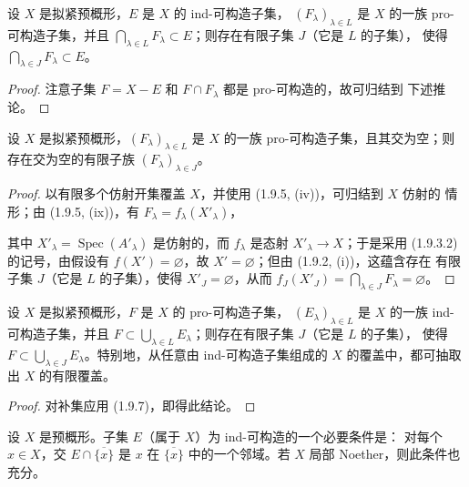 \begin{theorem}[1.9.7]
\label{IV.1.9.7-fr}
设 $X$ 是拟紧预概形，$E$ 是 $X$ 的 ind-可构造子集，
$(F_\lambda)_{\lambda\in L}$ 是 $X$ 的一族 pro-可构造子集，并且
$\bigcap_{\lambda\in L}F_\lambda\subset E$；则存在有限子集 $J$（它是 $L$ 的子集），
使得 $\bigcap_{\lambda\in J}F_\lambda\subset E$。
\end{theorem}

\begin{proof}
注意子集 $F=X-E$ 和 $F\cap F_\lambda$ 都是 pro-可构造的，故可归结到
下述推论。
\end{proof}

\begin{corollary}[1.9.8]
\label{IV.1.9.8-fr}
设 $X$ 是拟紧预概形，$(F_\lambda)_{\lambda\in L}$ 是 $X$ 的一族
pro-可构造子集，且其交为空；则存在交为空的有限子族
$(F_\lambda)_{\lambda\in J}$。
\end{corollary}

\begin{proof}
以有限多个仿射开集覆盖 $X$，并使用 (1.9.5, (iv))，可归结到 $X$ 仿射的
情形；由 (1.9.5, (ix))，有 $F_\lambda=f_\lambda(X'_\lambda)$，


其中 $X'_\lambda=\operatorname{Spec}(A'_\lambda)$ 是仿射的，而 $f_\lambda$
是态射 $X'_\lambda\to X$；于是采用 (1.9.3.2) 的记号，由假设有
$f(X')=\varnothing$，故 $X'=\varnothing$；但由 (1.9.2, (i))，这蕴含存在
有限子集 $J$（它是 $L$ 的子集），使得 $X'_J=\varnothing$，从而
$f_J(X'_J)=\bigcap_{\lambda\in J}F_\lambda=\varnothing$。
\end{proof}

\begin{corollary}[1.9.9]
\label{IV.1.9.9-fr}
设 $X$ 是拟紧预概形，$F$ 是 $X$ 的 pro-可构造子集，
$(E_\lambda)_{\lambda\in L}$ 是 $X$ 的一族 ind-可构造子集，并且
$F\subset\bigcup_{\lambda\in L}E_\lambda$；则存在有限子集 $J$（它是 $L$ 的子集），
使得 $F\subset\bigcup_{\lambda\in J}E_\lambda$。特别地，从任意由
ind-可构造子集组成的 $X$ 的覆盖中，都可抽取出 $X$ 的有限覆盖。
\end{corollary}

\begin{proof}
对补集应用 (1.9.7)，即得此结论。
\end{proof}

\begin{proposition}[1.9.10]
\label{IV.1.9.10-fr}
设 $X$ 是预概形。子集 $E$（属于 $X$）为 ind-可构造的一个必要条件是：
对每个 $x\in X$，交 $E\cap\overline{\{x\}}$ 是 $x$ 在
$\overline{\{x\}}$ 中的一个邻域。若 $X$ 局部 Noether，则此条件也充分。
\end{proposition}

